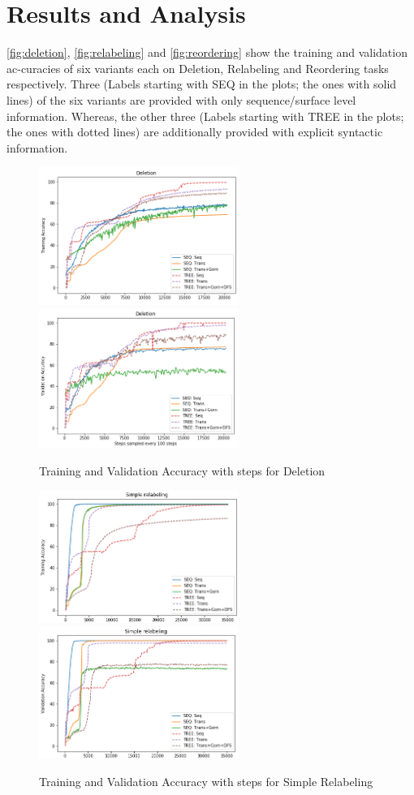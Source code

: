 \documentclass{article}
\begin{document}
\section{Results and Analysis}
\autoref{fig:deletion}, \autoref{fig:relabeling} and \autoref{fig:reordering} show the training and validation ac-curacies of six variants each on Deletion, Relabeling and Reordering tasks respectively. Three (Labels starting with SEQ in the plots; the ones with solid lines) of the six variants are provided with only sequence/surface level information. Whereas, the other three (Labels starting with TREE in the plots; the ones with dotted lines) are additionally provided with explicit syntactic information. 
\begin{figure}[H]
\includegraphics[width=6.5cm]{pictures/Deletion_Training.png}
\includegraphics[width=6.5cm]{pictures/Deletion_Validation.png}
    \caption{Training and Validation Accuracy with steps for Deletion}
    \label{fig:deletion}
\end{figure}
\begin{figure}[H]
\includegraphics[width=6.5cm]{pictures/Simple_Training.png}
\includegraphics[width=6.5cm]{pictures/Simple_Validation.png}
    \caption{Training and Validation Accuracy with steps for Simple Relabeling}
    \label{fig:relabeling}
\end{figure}
\end{document}
